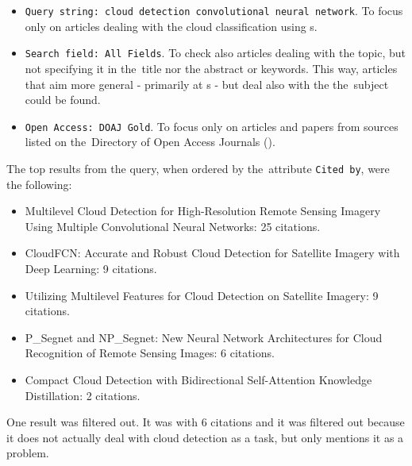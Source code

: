 \begin{itemize}
	\item \verb|Query string: cloud detection convolutional neural network|. To focus on\-ly on articles dealing with the cloud classification using s.
	\item \verb|Search field: All Fields|. To check also articles dealing with the topic, but not specifying it in the~title nor the abstract or keywords. This way, articles that aim more general - primarily at s - but deal also with the the~subject could be found.
	\item \verb|Open Access: DOAJ Gold|. To focus only on articles and papers from sources listed on the~Di\-rectory of Open Access Journals ().
\end{itemize}

\noindent The top results from the query, when ordered by the~attribute \verb|Cited by|, were the following:

\begin{itemize}
	\item Multilevel Cloud Detection for High-Resolution Remote Sensing Imagery Using Multiple Convolutional Neural Networks: 25 citations. \cite{multilevel-cloud-cnn}
	\item CloudFCN: Accurate and Robust Cloud Detection for Satellite Imagery with Deep Learning: 9 citations. \cite{cloudfcn}
	\item Utilizing Multilevel Features for Cloud Detection on Satellite Imagery: 9 citations. \cite{multilevel-features-cloud-cnn}
	\item P\_Segnet and NP\_Segnet: New Neural Network Architectures for Cloud Recognition of Remote Sensing Images: 6 citations. \cite{p-segnet-cloud}
	\item Compact Cloud Detection with Bidirectional Self-Attention Knowledge Distillation: 2 citations. \cite{bi-sad-cloud}
\end{itemize}

One result was filtered out. It was \cite{center-pivot-remote-sensing} with 6 citations and it was filtered out because it does not actually deal with cloud detection as a task, but only mentions it as a problem.

